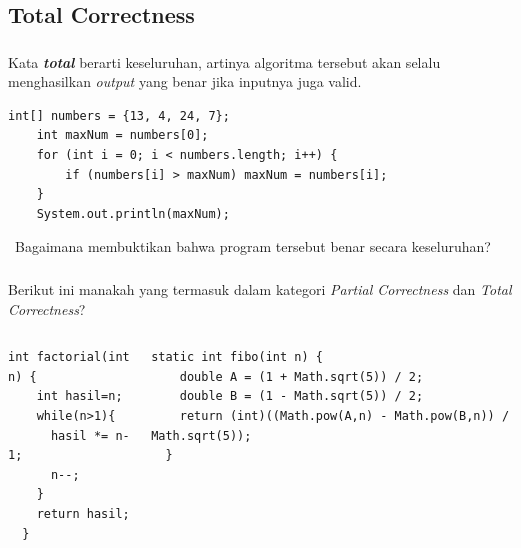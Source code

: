 \documentclass{../praktikum-ppt}
\begin{document}
    \subsection{Total Correctness}
    \begin{frame}[fragile]
      \frametitle{\insertsection}
      \framesubtitle{\insertsubsection}
      Kata \textbf{\textit{total}} berarti keseluruhan, artinya algoritma tersebut akan selalu menghasilkan \textit{output} yang benar jika inputnya juga valid.
      \begin{lstlisting}[caption={Nilai Maksimum Array (\textit{total})}]
    int[] numbers = {13, 4, 24, 7};
    int maxNum = numbers[0];
    for (int i = 0; i < numbers.length; i++) { 
        if (numbers[i] > maxNum) maxNum = numbers[i];  
    }
    System.out.println(maxNum);
      \end{lstlisting}
      \begin{exampleblock}{$\,$}
        Bagaimana membuktikan bahwa program tersebut benar secara keseluruhan?
      \end{exampleblock}
    \end{frame}

    \begin{frame}[fragile]
      \frametitle{\insertsection}
      \begin{contoh}
        Berikut ini manakah yang termasuk dalam kategori \textit{Partial Correctness} dan \textit{Total Correctness}?
      \end{contoh}
      \begin{columns}
        \begin{column}{0.37\textwidth}
          \begin{lstlisting}[caption={Faktorial},captionpos=b]
  int factorial(int n) {
    int hasil=n;
    while(n>1){
      hasil *= n-1;
      n--;
    }
    return hasil;
  }
          \end{lstlisting}
        \end{column}
        \begin{column}{0.53\textwidth}
          \begin{lstlisting}[caption={Fibonacci},captionpos=b]
  static int fibo(int n) {
    double A = (1 + Math.sqrt(5)) / 2;
    double B = (1 - Math.sqrt(5)) / 2;
    return (int)((Math.pow(A,n) - Math.pow(B,n)) / Math.sqrt(5));
  }
          \end{lstlisting}
        \end{column}
      \end{columns}
    \end{frame}
\end{document}
